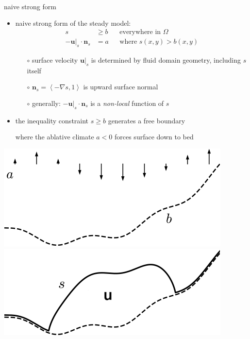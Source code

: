 \documentclass[svgnames,
               hyperref={colorlinks,citecolor=DeepPink4,linkcolor=FireBrick,urlcolor=Maroon},
               usepdftitle=false]  %
               {beamer}
\newcommand{\grad}{\nabla}
\newcommand{\bn}{\mathbf{n}}
\newcommand{\bu}{\mathbf{u}}
\begin{document}
\begin{frame}{naive strong form}

\begin{itemize}
\item naive strong form of the steady model: %
\begin{align*}
s &\ge b                    & &\text{everywhere in } \Omega \\
-\bu|_s \cdot \bn_s &= a    & &\text{where } s(x,y) > b(x,y)
\end{align*}

    \begin{itemize}
    \item[$\circ$] surface velocity $\bu|_s$ is determined by fluid domain geometry, including $s$ itself
    \item[$\circ$] $\bn_s=\left<-\grad s,1\right>$ is upward surface normal
    \item[$\circ$] generally: $-\bu|_s \cdot \bn_s$ is a \emph{non-local} function of $s$
    \end{itemize}
\item the inequality constraint $s \ge b$ \alert{generates a free boundary}

where the ablative climate $a < 0$ forces surface down to bed
\end{itemize}

\bigskip
\hfill \mbox{\includegraphics[height=0.2\textheight]{images/domain-data.png} \hspace{7mm} \includegraphics[height=0.2\textheight]{images/domain-velocity.png}}
\end{frame}
\end{document}
